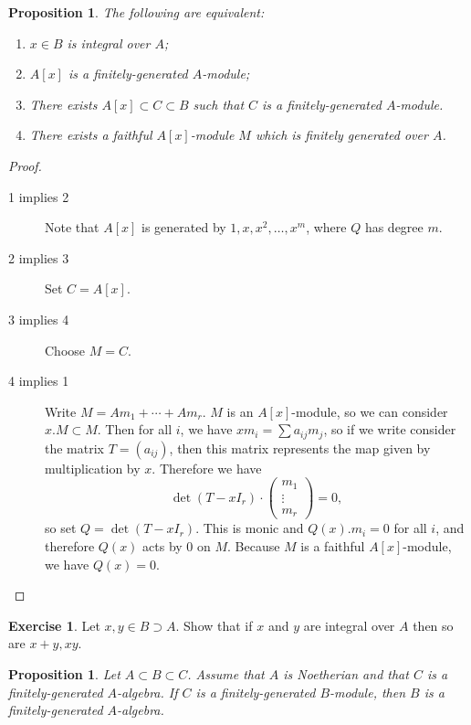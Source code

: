 \documentclass[leqno, openany]{memoir}
\newtheorem{prop}[thm]{Proposition}
\theoremstyle{definition}
\newtheorem{exer}[thm]{Exercise}
\theoremstyle{remark}
\theoremstyle{plain}
\theoremstyle{definition}
\theoremstyle{remark}
\begin{document}
\begin{prop}
    \label{prop:integral}
    The following are equivalent:
    \begin{enumerate}
        \item $x \in B$ is integral over $A$;
        \item $A[x]$ is a finitely-generated $A$-module;
        \item There exists $A[x] \subset C \subset B$ such that $C$ is a finitely-generated $A$-module.
        \item There exists a faithful $A[x]$-module $M$ which is finitely generated over $A$.
    \end{enumerate}
\end{prop}

\begin{proof}
    \begin{description}
        \item[1 implies 2] Note that $A[x]$ is generated by $1,x,x^2, \ldots, x^m$, where $Q$ has degree $m$.
        \item[2 implies 3] Set $C = A[x]$.
        \item[3 implies 4] Choose $M = C$.
        \item[4 implies 1] Write $M = Am_1 + \cdots + A m_r$. $M$ is an $A[x]$-module, so we can consider $x . M \subset M$. Then for all $i$, we have $x m_i = \sum a_{ij} m_j$, so if we write consider the matrix $T = (a_{ij})$, then this matrix represents the map given by multiplication by $x$. Therefore we have
            \[ \det (T - x I_r) \cdot \begin{pmatrix}
                m_1 \\ \vdots \\ m_r
            \end{pmatrix} = 0, \]
            so set $Q = \det(T - x I_r)$. This is monic and $Q(x) . m_i = 0$ for all $i$, and therefore $Q(x)$ acts by $0$ on $M$. Because $M$ is a faithful $A[x]$-module, we have $Q(x) = 0$.
    \end{description}
\end{proof}

\begin{exer}
    Let $x,y \in B \supset A$. Show that if $x$ and $y$ are integral over $A$ then so are $x+y,xy$.
\end{exer}

\begin{prop}
    Let $A \subset B \subset C$. Assume that $A$ is Noetherian and that $C$ is a finitely-generated $A$-algebra. If $C$ is a finitely-generated $B$-module, then $B$ is a finitely-generated $A$-algebra.
\end{prop}
\end{document}
